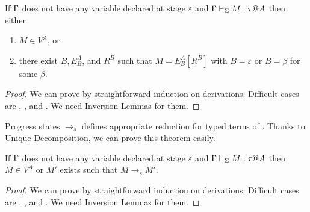 \begin{theorem}
	If $\Gamma$ does not have any variable declared at stage $\varepsilon$ 
	and $\Gamma \vdash_\Sigma M : \tau @ A$ then either
	\begin{enumerate}
		\item $ M \in V^A$, or
		\item there exist $B, E^A_B$, and $R^B$ such that $M = E^A_B[R^B]$ with $B = \varepsilon$ or $B = \beta$ for some $\beta$.
	\end{enumerate}
\end{theorem}

\begin{proof}
	We can prove by straightforward induction on derivations.
	Difficult cases are \TApp, \TTBL, and \TIns.
	We need Inversion Lemmas for them.
\end{proof}

Progress states $\longrightarrow_s$ defines appropriate reduction for typed terms of \LMD.
Thanks to Unique Decomposition, we can prove this theorem easily.

\begin{theorem}[Progress]
	If $\Gamma$ does not have any variable declared at stage $\varepsilon$ and $\Gamma \vdash_\Sigma M : \tau  @ A$ then
	$ M \in V^A $ or $M'$ exists such that $M \longrightarrow_s M'$.
\end{theorem}

\begin{proof}
	We can prove by straightforward induction on derivations.
	Difficult cases are \TApp, \TTBL, and \TIns.
	We need Inversion Lemmas for them.
\end{proof}